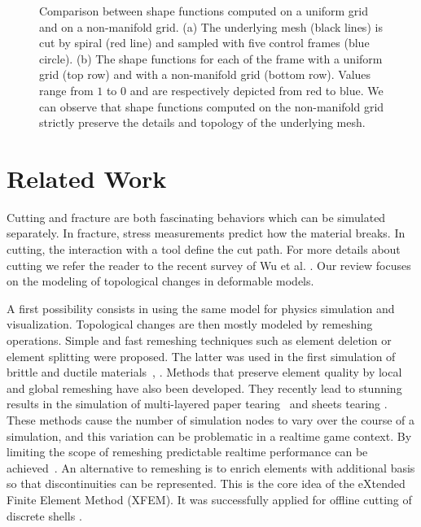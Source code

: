 \documentclass[11pt, oneside, a4paper]{memoir}
\begin{document}
\begin{figure}[!ht]
\begin{subfigure}[c]{0.70\linewidth}
\caption{\label{fig:weightShow}}
\end{subfigure}
\caption{\label{fig:spiralWeight}
Comparison between shape functions computed on a uniform grid and on a non-manifold grid. (a) The underlying mesh (black lines) is cut by spiral (red line) and sampled with five control frames (blue circle). (b) The shape functions for each of the frame with a uniform grid (top row) and with a non-manifold grid (bottom row). Values range from $1$ to $0$ and are respectively depicted from red to blue. We can observe that shape functions computed on the non-manifold grid strictly preserve the details and topology of the underlying mesh.}
\end{figure}
\section{Related Work}

Cutting and fracture are both fascinating behaviors which can be simulated separately. In fracture, stress measurements predict how the material breaks. In cutting, the interaction with a tool define the cut path. For more details about cutting we refer the reader to the recent survey of Wu et al. \cite{Wu2015}. Our review focuses on the modeling of topological changes in deformable models.

A first possibility consists in using the same model for physics simulation and visualization. Topological changes are then mostly modeled by remeshing operations. Simple and fast remeshing techniques such as element deletion or element splitting were proposed. The latter was used in the first simulation of brittle and ductile materials~\cite{OBrien1999}, \cite{OBrien2002}. 
 Methods that preserve element quality by local and global remeshing have also been developed. They recently lead to stunning results in the simulation of multi-layered paper tearing~\cite{Busaryev2013} and sheets tearing \cite{Pfaff2014}. 
These methods cause the number of simulation nodes to vary over the course of a simulation, and this variation can be problematic in a realtime game context.  By limiting the
scope of remeshing predictable realtime performance can be achieved~\cite{Parker2009}.
An alternative to remeshing is to enrich elements with additional basis so that discontinuities can be represented. This is the core idea of the eXtended Finite Element Method (XFEM). It was successfully applied for offline cutting of discrete shells \cite{Kaufmann2009}.
\end{document}
